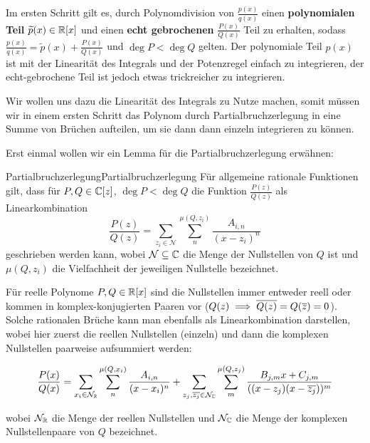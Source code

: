 Im ersten Schritt gilt es, durch Polynomdivision von $\frac{p(x)}{q(x)}$ einen \textbf{polynomialen Teil} $\widetilde{p}(x)\in \mathbb{R}[x]$ und einen \textbf{echt gebrochenen} $\frac{P(x)}{Q(x)}$ Teil zu erhalten, sodass $\frac{p(x)}{q(x)} = \widetilde{p}(x) + \frac{P(x)}{Q(x)}$ und $\deg P < \deg Q$ gelten. Der polynomiale Teil $p(x)$ ist mit der Linearität des Integrals und der Potenzregel einfach zu integrieren, der echt-gebrochene Teil ist jedoch etwas trickreicher zu integrieren.

Wir wollen uns dazu die Linearität des Integrals zu Nutze machen, somit müssen wir in einem ersten Schritt das Polynom durch Partialbruchzerlegung in eine Summe von Brüchen aufteilen, um sie dann dann einzeln integrieren zu können.

Erst einmal wollen wir ein Lemma für die Partialbruchzerlegung erwähnen:

\begin{lemma}{Partialbruchzerlegung}{Partialbruchzerlegung}
Für allgemeine rationale Funktionen gilt, dass für $P, Q \in \mathbb{C}[z]$, $\deg P < \deg Q$ die Funktion $\frac{P(z)}{Q(z)}$ als Linearkombination $$\frac{P(z)}{Q(z)} = \sum_{z_i \in \mathcal{N}}\sum_n^{\mu(Q, z_i)} \frac{A_{i,n}}{(x-z_i)^n}$$ geschrieben werden kann, wobei $\mathcal{N} \subseteq \mathbb{C}$ die Menge der Nullstellen von $Q$  ist und $\mu(Q, z_i)$ die Vielfachheit der jeweiligen Nullstelle bezeichnet.

Für reelle Polynome $P, Q \in \mathbb{R}[x]$ sind die Nullstellen immer entweder reell oder kommen in komplex-konjugierten Paaren vor ($Q(z) \implies \overline{Q(z)} = Q(\overline{z}) = 0$). Solche rationalen Brüche kann man ebenfalls als Linearkombination darstellen, wobei hier zuerst die reellen Nullstellen (einzeln) und dann die komplexen Nullstellen paarweise aufsummiert werden:

$$\frac{P(x)}{Q(x)} = \sum_{x_i \in \mathcal{N}_{\mathbb{R}}}\sum_n^{\mu(Q, x_i)} \frac{A_{i,n}}{(x-x_i)^n} +
\sum_{z_j, \overline{z_j} \in \mathcal{N}_{\mathbb{C}}}\sum_m^{\mu(Q, z_j)} \frac{B_{j,m}x + C_{j,m}}{((x-z_j)(x- \overline{z_j}))^m}$$

wobei $\mathcal{N}_{\mathbb{R}}$ die Menge der reellen Nullstellen und $\mathcal{N}_{\mathbb{C}}$ die Menge der komplexen Nullstellenpaare von $Q$ bezeichnet.
\end{lemma}

